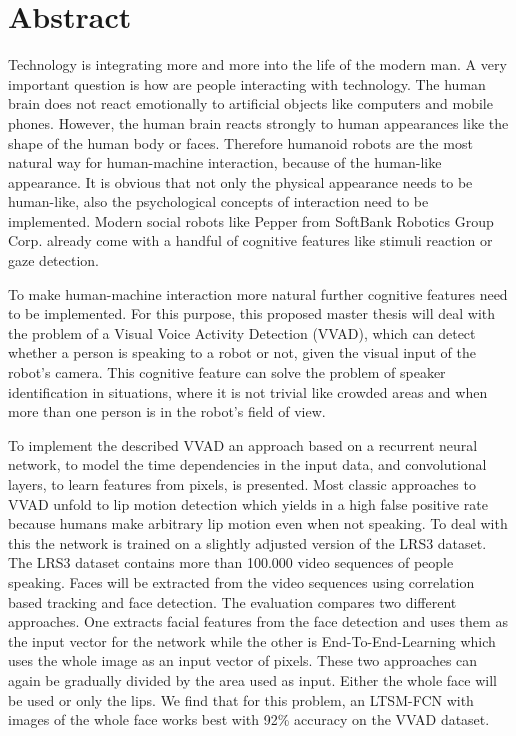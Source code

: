 \chapter{Abstract}
Technology is integrating more and more into the life of the modern man. A very important
question is how are people interacting with technology.
The human brain does not react emotionally to artificial objects like computers and
mobile phones. However, the human brain reacts strongly to human appearances like
the shape of the human body or faces. Therefore humanoid robots are the most
natural way for human-machine interaction, because of the human-like appearance.
It is obvious that not only the physical appearance needs to be human-like, also the psychological concepts of interaction need to be implemented.
Modern social robots like Pepper from SoftBank Robotics Group Corp. already come with a handful of cognitive features like stimuli reaction or gaze detection.

To make human-machine interaction more natural further cognitive features need to be implemented. 
For this purpose, this proposed master thesis will deal with the problem of a Visual Voice Activity Detection (VVAD), which can detect whether a person is speaking to a robot or not, given the visual input of the robot's camera.
This cognitive feature can solve the problem of
speaker identification in situations, where it is not trivial like crowded areas and when more than one person is in the robot's field of view.

To implement the described VVAD an approach based on a recurrent neural network, to model the time dependencies in the input data,
and convolutional layers, to learn features from pixels, is presented.
Most classic approaches to VVAD unfold to lip motion detection which yields in a high false positive rate because humans make arbitrary lip motion even when not speaking.
To deal with this the network is trained on a slightly adjusted version of the LRS3 dataset. 
The LRS3 dataset contains more than 100.000 video sequences of people speaking. 
Faces will be extracted from the video sequences using correlation based tracking and face detection. 
The evaluation compares two different approaches.
One extracts facial features from the face detection and uses them as the input vector for the network while the other is End-To-End-Learning which uses the whole image as an input vector of pixels. 
These two approaches can again be gradually divided by the area used as input. 
Either the whole face will be used or only the lips.
We find that for this problem, an LTSM-FCN with images of the whole face works best with 92\% accuracy on the VVAD dataset.
